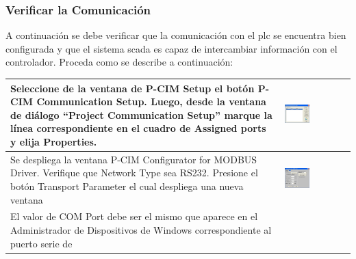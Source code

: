 \subsubsection{Verificar la Comunicación}
A continuación se debe verificar que la comunicación con el \gls{plc}
se encuentra bien configurada y que el sistema \gls{scada} es capaz de
intercambiar información con el controlador.
Proceda como se describe a continuación:
\begin{table}[!ht]
\centering
\renewcommand*{\arraystretch}{0.01}
\begin{tabular}{*{2}{m{}}}
\hline
  Seleccione de la  ventana de P-CIM Setup  el botón P-CIM Communication Setup. 
  Luego, desde la ventana de diálogo ``Project Communication Setup'' 
  marque la línea correspondiente en el cuadro de Assigned ports y 
  elija  Properties.
    &\begin{center}
       \includegraphics[width=0.4\textwidth]
	{Cap5-SCADA/images/commSetup.jpeg}
    \end{center}\\
\hline
   Se despliega la ventana P-CIM Configurator for MODBUS Driver. Verifique 
   que Network Type sea RS232. Presione el botón Transport Parameter el cual 
   despliega una nueva ventana
  &\begin{center}
    \includegraphics[width=0.4\textwidth]
      {Cap5-SCADA/images/modbusDriver.jpeg}
  \end{center}\\
\hline 
   El valor de COM Port debe ser el mismo que aparece en el Administrador de 
   Dispositivos de Windows correspondiente al puerto serie de 

\end{tabular}
\end{table}
